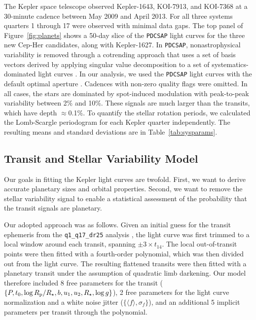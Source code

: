 \documentclass[12pt,twocolumn,linenumbers]{aastex63}
\begin{document}
The Kepler space telescope observed Kepler-1643, KOI-7913, and
KOI-7368 at a 30-minute cadence between May 2009 and April 2013.  For
all three systems quarters 1 through 17 were observed with minimal  data
gaps.  The top panel of
Figure~\ref{fig:planets} shows a 50-day slice of the \texttt{PDCSAP}
light curves for the three new Cep-Her candidates, along with
Kepler-1627.  In \texttt{PDCSAP}, nonastrophysical variability is
removed through a cotrending approach that uses a set of basis vectors
derived by applying singular value decomposition to a set of
systematics-dominated light curves
\citep{smith_kepler_PDC_2017}.  In our analysis, we used the
\texttt{PDCSAP} light curves with the default optimal aperture
\citep{smith_finding_2016}.  Cadences with non-zero quality flags were
omitted.  In all cases, the stars are dominated by spot-induced
modulation with peak-to-peak variability between 2\% and 10\%.  These
signals are much larger than the transits, which have depth
$\approx$0.1\%.
To quantify the stellar rotation periods, we calculated the
Lomb-Scargle periodogram for each Kepler quarter independently.  The
resulting means and standard deviations are in
Table~\ref{tab:sysparams}.


\subsection{Transit and Stellar Variability Model}
\label{sec:fitting}

Our goals in fitting the Kepler light curves are twofold.  First, we
want to derive accurate planetary sizes and orbital properties.
Second, we want to remove the stellar variability signal to enable a
statistical assessment of the probability that the transit signals are
planetary.

Our adopted approach was as follows.  Given an initial guess for the
transit ephemeris from the \texttt{q1\_q17\_dr25} analysis
\citep{thompson_planetary_2018}, the light curve was first trimmed to
a local window around each transit, spanning $\pm 3\times t_{14}$.
The local out-of-transit points were then fitted with a fourth-order
polynomial, which was then divided out from the light curve.  The
resulting flattened transits were then fitted with a 
planetary transit under the assumption of quadratic limb darkening.
Our model therefore included 8 free parameters for the transit ($\{P,
t_0, \log R_{\rm p}/R_\star, b, u_1 ,u_2, R_\star, \log g\}$), 2 free
parameters for the light curve normalization and a white noise jitter
($\{\langle f \rangle, \sigma_f \}$), and an additional 5 implicit
parameters per transit through the polynomial.
\end{document}
